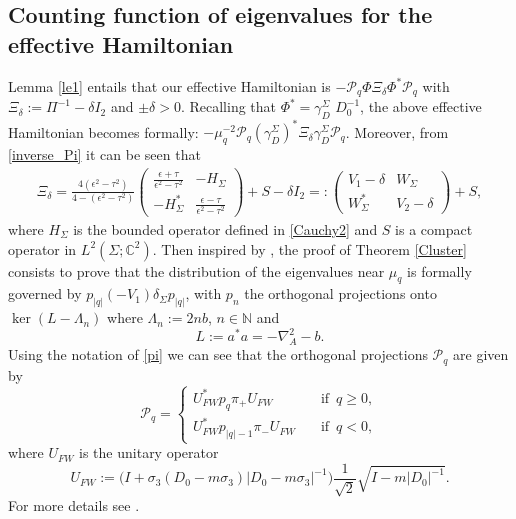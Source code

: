\documentclass[11pt,a4paper,reqno,oneside]{amsproc}
\def \cc {{\mathbb C}}
\def \nn {{\mathbb N}}
\numberwithin{equation}{section}
\def \cc {{\mathbb{C}}}
\begin{document}
\subsection{Counting function of eigenvalues for the effective Hamiltonian}\label{SEC52}
   Lemma \ref{le1} entails that our {effective Hamiltonian} is  $-\mathcal P_q\Phi \Xi_{\delta} \Phi^{*}\mathcal P_q$  with $\Xi_{\delta}:= \Pi^{-1} -\delta I_2$ and  $\pm \delta >0$. 
Recalling  that $\Phi^{*}=\gamma^\Sigma_D\,\,D_{0}^{-1}$, the above effective Hamiltonian becomes formally:
\(
- \mu_q^{-2} \mathcal P_q (\gamma^\Sigma_D)^{*} \Xi_{\delta} \gamma^\Sigma_D\mathcal P_q
\). 
Moreover, from \eqref{inverse_Pi} it can be seen that
\begin{align*}
\Xi_{\delta}=\frac{4(\epsilon^2-\tau^2)}{4-(\epsilon^2-\tau^2)}
\begin{pmatrix}
\frac{\epsilon +\tau}{ \epsilon^2-\tau^2}& - H_\Sigma\\
- H_\Sigma^* & \frac{\epsilon -\tau}{\epsilon^2-\tau^2}
\end{pmatrix}
+S - \delta I_2=:  \begin{pmatrix}
V_1 - \delta & W_\Sigma\\
W^*_\Sigma &V_2 - \delta
\end{pmatrix}
+S,
\end{align*}
 where  \( H_\Sigma\) is the bounded operator defined in \eqref{Cauchy2} and $S$ is a compact operator in $L^2(\Sigma;\cc^2)$. Then inspired by \cite{BM}, the proof of Theorem \ref{Cluster} consists to prove that the distribution of the eigenvalues near $\mu_q$ is formally governed by $ p_{|q|}  (- V_1)  \delta_\Sigma p_{|q|}$, with $p_n$  the orthogonal projections onto $\ker(L -\Lambda_{n})$ where $\Lambda_n:=2nb$, $n \in \nn$ and
 \[ 
L:= a^* a = -\nabla_A^2  -b.
\]
Using the notation of \eqref{pi} we can see that  the orthogonal projections $\mathcal P_q$ are given by
\[
\mathcal{P}_q =
\begin{cases}
U_{FW}^*p_q\pi_+ U_{FW}\quad&\text{if }\,q\geq 0,\\
U_{FW}^*p_{|q|-1}\pi_- U_{FW}\quad&\text{if }\,q< 0,
\end{cases}
\]
where $U_{FW}$ is the unitary operator
\[
U_{FW}:=
\bigl(I + \sigma_3 (D_0 - m \sigma_3)|D_0 - m \sigma_3|^{-1} \bigr)\frac1{\sqrt 2} \sqrt{I - m |D_0|^{-1}}.
\]
For more details see \cite[Section 3]{BM}.
\end{document}
